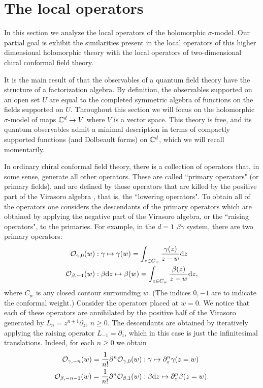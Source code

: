 \documentclass[10pt]{amsart}
\begin{document}
%


\section{The local operators}

In this section we analyze the local operators of the holomorphic $\sigma$-model. 
Our partial goal is exhibit the similarities present in the local operators of this higher dimensional holomorphic theory with the local operators of two-dimensional chiral conformal field theory.

It is the main result of \cite{CG2} that the observables of a quantum field theory have the structure of a factorization algebra.
By definition, the observables supported on an open set $U$ are equal to the completed symmetric algebra of functions on the fields supported on $U$. 
Throughout this section we will focus on the holomorphic $\sigma$-model of maps $\mathbb C^d \to V$ where $V$ is a vector space.
This theory is free, and its quantum observables admit a minimal description in terms of compactly supported functions (and Dolbeault forms) on $\mathbb C^d$, which we will recall momentarily.

In ordinary chiral conformal field theory, there is a collection of operators that, in some sense, generate all other operators. 
These are called ``primary operators" (or primary fields), and are defined by those operators that are killed by the positive part of the Virasoro algebra \cite{polchinski}, that is, the ``lowering operators". 
To obtain all of the operators one considers the descendants of the primary operators which are obtained by applying the negative part of the Virasoro algebra, or the ``raising operators", to the primaries. 
For example, in the $d=1$ $\beta\gamma$ system, there are two primary operators:
\begin{align*}
\mathcal O_{\gamma,0} (w) & : \gamma \mapsto \gamma(w) = \int_{z \in C_w} \frac{\gamma(z)}{z-w} {\rm d} z  \\
\mathcal O_{\beta,-1} (w) & : \beta {\rm d} z \mapsto \beta(w) = \int_{z \in C_w} \frac{\beta(z)}{z-w} {\rm d} z ,
\end{align*}
where $C_w$ is any closed contour surrounding $w$. 
(The indices $0,-1$ are to indicate the conformal weight.)
Consider the operators placed at $w=0$.
We notice that each of these operators are annihilated by the positive half of the Virasoro generated by $L_n = z^{n+1} \partial_z$, $n \geq 0$.
The descendants are obtained by iteratively applying the raising operator $L_{-1} = \partial_z$, which in this case is just the infinitesimal translations. 
Indeed, for each $n \geq 0$ we obtain
\begin{align*}
\mathcal O_{\gamma,-n}(w) = \frac{1}{n!} \partial^n \mathcal O_{\gamma,0}(w) & : \gamma \mapsto \partial_z^n \gamma(z = w) \\
\mathcal O_{\beta,-n-1}(w) = \frac{1}{n!} \partial^n \mathcal O_{\beta,1}(w) & : \beta {\rm d} z \mapsto \partial_z^n \beta(z=w) .
\end{align*}
\end{document}
